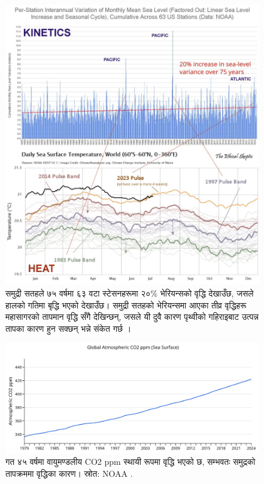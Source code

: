 \documentclass[10pt,twocolumn,letterpaper]{article}
\begin{document}
\begin{figure}[t]
\begin{center}
\includegraphics[width=1\textwidth]{sealevel.jpeg}
\end{center}
   \caption{समुद्री सतहले ७५ वर्षमा ६३ वटा स्टेसनहरूमा २०\% भेरियन्सको वृद्धि देखाउँछ, जसले हालको गतिमा बृद्धि भएको देखाउँछ। समुद्री सतहको भेरियन्समा आएका तीव्र वृद्धिहरू महासागरको तापमान वृद्धि सँगै देखिन्छन्, जसले यी दुवै कारण पृथ्वीको गहिराइबाट उत्पन्न तापका कारण हुन सक्छन् भन्ने संकेत गर्छ \cite{2,129}।}
\label{fig:22}
\end{figure}

\begin{figure}[t]
\begin{center}
\includegraphics[width=1\textwidth]{co2.jpg}
\end{center}
   \caption{गत ४५ वर्षमा वायुमण्डलीय CO2 ppm स्थायी रूपमा वृद्धि भएको छ, सम्भवतः समुद्रको तापक्रममा वृद्धिका कारण। स्रोत: NOAA \cite{148,129}.}
\label{fig:23}
\end{figure}
\end{document}
